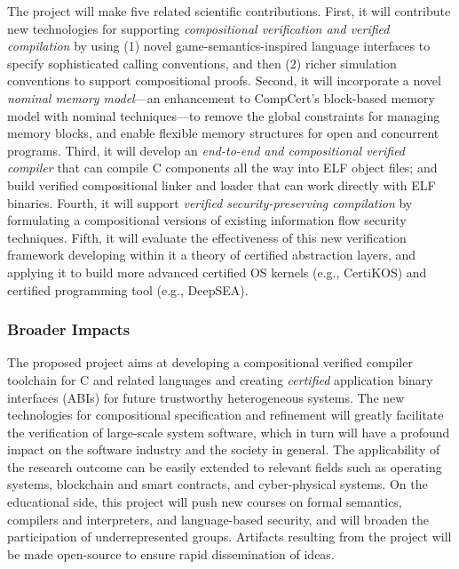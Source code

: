 The project will make five related scientific
contributions. First, it will contribute new technologies for supporting
{\em compositional verification and verified compilation} by using (1) novel
game-semantics-inspired language interfaces to specify sophisticated
calling conventions, and then (2) richer simulation conventions
to support compositional proofs.  Second, it
will incorporate a novel {\em nominal memory model}---an enhancement to
CompCert's block-based memory model with nominal techniques---to
remove the global constraints for managing memory blocks, and enable
flexible memory structures for open and concurrent programs. Third, it
will develop an {\em end-to-end and compositional verified compiler}
that can compile C components all the way into ELF object files; and
build verified compositional linker and loader that can work directly
with ELF binaries.  Fourth, it will support {\em verified
security-preserving compilation} by
formulating a compositional versions
of existing information flow security techniques.
Fifth, it will evaluate the
effectiveness of this new verification framework
developing within it a theory of certified abstraction layers, and
applying it to build
more advanced certified OS kernels (e.g., CertiKOS) and certified
programming tool (e.g., DeepSEA).

\subsubsection*{Broader Impacts}

The proposed project aims at developing a compositional verified
compiler toolchain for C and related languages and creating {\em
certified} application binary interfaces (ABIs) for future trustworthy
heterogeneous systems. The new technologies for compositional
specification and refinement will greatly facilitate the verification
of large-scale system software, which in turn will have a profound impact
on the software industry and the society in general. The applicability
of the research outcome can be easily extended to relevant fields such
as operating systems, blockchain and smart contracts, and
cyber-physical systems.  On the educational side, this project will
push new courses on formal semantics, compilers and interpreters, and
language-based security, and will broaden the participation of
underrepresented groups.  Artifacts resulting from the project will be
made open-source to ensure rapid dissemination of ideas.

